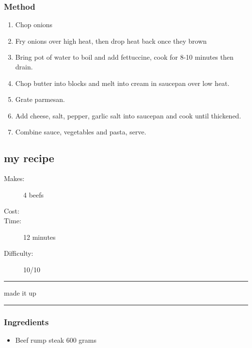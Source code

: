 \documentclass[]{article}
\begin{document}
\subsubsection*{\Large Method}
\begin{enumerate}[font=\huge\color{accent}]
	\item Chop onions
	\item Fry onions over high heat, then drop heat back once they brown
	\item Bring pot of water to boil and add fettuccine, cook for 8-10 minutes then drain.
	\item Chop butter into blocks and melt into cream in saucepan over low heat.
	\item Grate parmesan.
	\item Add cheese, salt, pepper, garlic salt into saucepan and cook until thickened.
	\item Combine sauce, vegetables and pasta, serve.
\end{enumerate}
\newpage
{}\label{rec:my recipe}
\subsection*{\center\huge my recipe}
\begin{description}
\item[Makes:] 4 beefs
\item[Cost:] \textdollar
\item[Time:] 12 minutes
\item[Difficulty:] 10/10
\end{description}
\vspace{0.2cm}\hrule\vspace{0.5cm}
\begin{adjustwidth}{0.5 cm}{0.5 cm}

made it up \hfill\color{accent}{\Large\faVimeoSquare\hspace{0.1cm}}\color{black}

\end{adjustwidth}
\vspace{0.5cm}\hrule
\subsubsection*{\Large Ingredients}
\begin{multicols}{2}
\begin{itemize}
 \item Beef rump steak \hfill 600 grams
\end{itemize}
\end{multicols}
\end{document}
